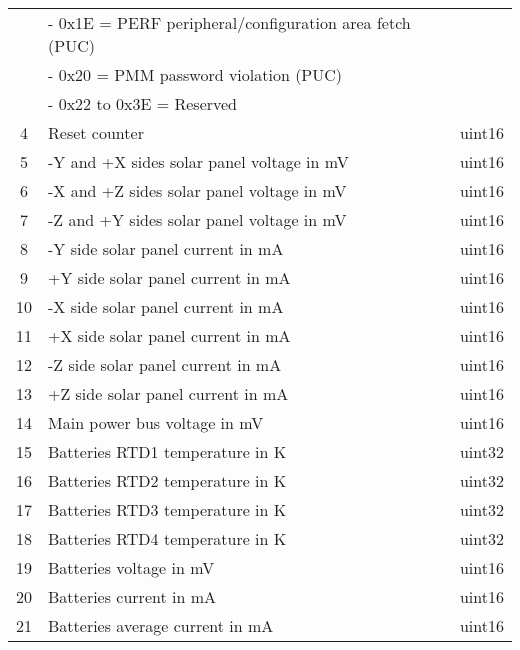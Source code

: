 \begin{longtable}[c]{cL{0.82\textwidth}l}
        & - 0x1E = PERF peripheral/configuration area fetch (PUC)           &        \\
        & - 0x20 = PMM password violation (PUC)                             &        \\
        & - 0x22 to 0x3E = Reserved                                         &        \\
    4   & Reset counter                                                     & uint16 \\
    5   & -Y and +X sides solar panel voltage in mV                         & uint16 \\
    6   & -X and +Z sides solar panel voltage in mV                         & uint16 \\
    7   & -Z and +Y sides solar panel voltage in mV                         & uint16 \\
    8   & -Y side solar panel current in mA                                 & uint16 \\
    9   & +Y side solar panel current in mA                                 & uint16 \\
    10  & -X side solar panel current in mA                                 & uint16 \\
    11  & +X side solar panel current in mA                                 & uint16 \\
    12  & -Z side solar panel current in mA                                 & uint16 \\
    13  & +Z side solar panel current in mA                                 & uint16 \\
    14  & Main power bus voltage in mV                                      & uint16 \\
    15  & Batteries RTD1 temperature in K                                   & uint32 \\
    16  & Batteries RTD2 temperature in K                                   & uint32 \\
    17  & Batteries RTD3 temperature in K                                   & uint32 \\
    18  & Batteries RTD4 temperature in K                                   & uint32 \\
    19  & Batteries voltage in mV                                           & uint16 \\
    20  & Batteries current in mA                                           & uint16 \\
    21  & Batteries average current in mA                                   & uint16 \\

\end{longtable}
